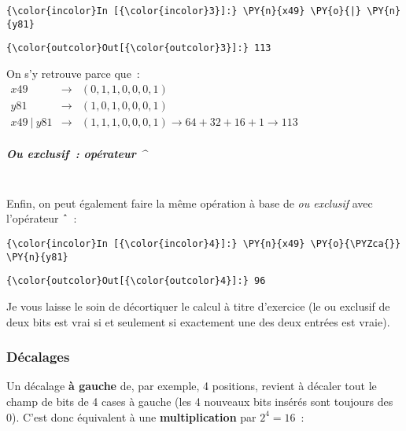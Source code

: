     \begin{Verbatim}[commandchars=\\\{\}]
{\color{incolor}In [{\color{incolor}3}]:} \PY{n}{x49} \PY{o}{|} \PY{n}{y81}
\end{Verbatim}


\begin{Verbatim}[commandchars=\\\{\}]
{\color{outcolor}Out[{\color{outcolor}3}]:} 113
\end{Verbatim}
            
    On s'y retrouve parce que~:\\

\(\begin{array}{rcl} x49 & \rightarrow & (0,1,1,0,0,0,1) \\ y81 & \rightarrow & (1,0,1,0,0,0,1) \\ x49\ |\ y81 & \rightarrow & (1,1,1,0,0,0,1) \rightarrow 64 + 32 + 16 + 1 \rightarrow 113 \end{array}\)

    \hypertarget{ou-exclusif-opuxe9rateur}{%
\subparagraph{Ou exclusif~: opérateur
\^{}\\\\}\label{ou-exclusif-opuxe9rateur}}

    Enfin, on peut également faire la même opération à base de \emph{ou
exclusif} avec l'opérateur \texttt{ˆ}~:

    \begin{Verbatim}[commandchars=\\\{\}]
{\color{incolor}In [{\color{incolor}4}]:} \PY{n}{x49} \PY{o}{\PYZca{}} \PY{n}{y81}
\end{Verbatim}


\begin{Verbatim}[commandchars=\\\{\}]
{\color{outcolor}Out[{\color{outcolor}4}]:} 96
\end{Verbatim}
            
    Je vous laisse le soin de décortiquer le calcul à titre d'exercice (le
ou exclusif de deux bits est vrai si et seulement si exactement une des
deux entrées est vraie).

    \hypertarget{duxe9calages}{%
\subsubsection{Décalages}\label{duxe9calages}}

    Un décalage \textbf{à gauche} de, par exemple, 4 positions, revient à
décaler tout le champ de bits de 4 cases à gauche (les 4 nouveaux bits
insérés sont toujours des 0). C'est donc équivalent à une
\textbf{multiplication} par \(2^4 = 16\)~:

